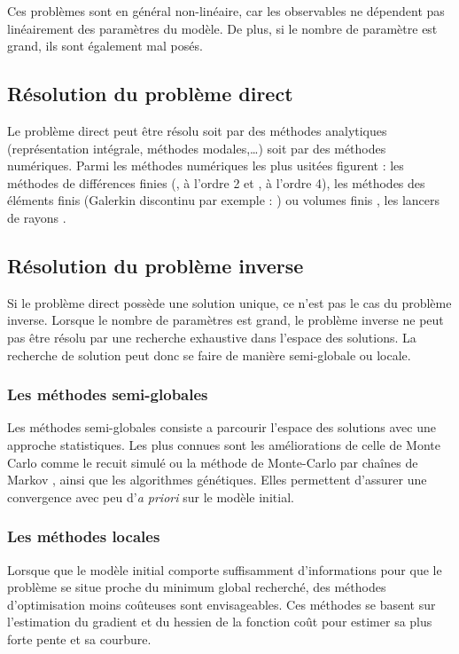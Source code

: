 Ces problèmes sont en général non-linéaire, car les observables ne dépendent pas linéairement des paramètres du modèle. De plus, si le nombre de paramètre est grand, ils sont également mal posés.\\

\subsection{Résolution du problème direct}

Le problème direct peut être résolu soit par des méthodes analytiques (représentation intégrale, méthodes modales,\ldots) soit par des méthodes numériques. Parmi les méthodes numériques les plus usitées figurent : les méthodes de différences finies (\citealp{virieux_86}, à l'ordre 2 et \citealp{levander}, à l'ordre 4), les méthodes des éléments finis (Galerkin discontinu par exemple : \citealp{brossier_these}) ou volumes finis \citep{brossier_2008}, les lancers de rayons \citep{virieux_ray}. 

\subsection{Résolution du problème inverse}
Si le problème direct possède une solution unique, ce n'est pas le cas du problème inverse.
Lorsque le nombre de paramètres est grand, le problème inverse ne peut pas être résolu par une recherche exhaustive dans l'espace des solutions. La recherche de solution peut donc se faire de manière semi-globale ou locale.\\

\subsubsection{Les méthodes semi-globales}
Les méthodes semi-globales consiste a parcourir l'espace des solutions avec une approche statistiques. Les plus connues sont les améliorations de celle de Monte Carlo comme le recuit simulé \citep{tarantola_book, sen} ou  la méthode de Monte-Carlo par chaînes de Markov \citep{zhang}, ainsi que les algorithmes génétiques. Elles permettent d'assurer une convergence avec peu d'\emph{a priori} sur le modèle initial.\\

\subsubsection{Les méthodes locales}
Lorsque que le modèle initial comporte suffisamment d'informations pour que le problème se situe proche du minimum global recherché, des méthodes d'optimisation moins coûteuses sont envisageables. Ces méthodes se basent sur l'estimation du gradient et du hessien de la fonction coût pour estimer sa plus forte pente et sa courbure.\\

